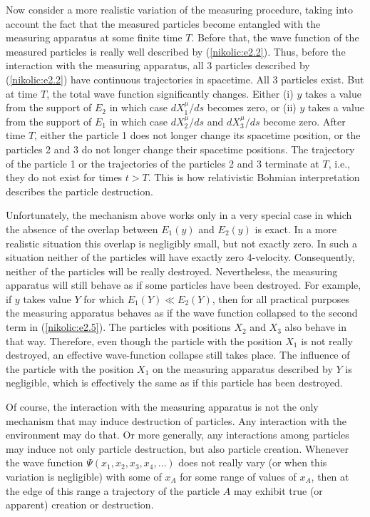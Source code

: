 \documentclass[12pt,twoside]{report} %
\begin{document}
Now consider a more realistic variation of the measuring procedure, taking into account
the fact that the measured particles become entangled with the measuring apparatus 
at some finite time $T$.
Before that, the wave function of the measured particles is really well described by 
(\ref{nikolic:e2.2}). Thus, before the interaction with the measuring apparatus, all 3 
particles described by (\ref{nikolic:e2.2}) have continuous trajectories in spacetime.
All 3 particles exist. But at time $T$, the total wave function significantly changes.
Either (i) $y$ takes a value from the support of $E_2$ in which case
$dX_1^{\mu}/ds$ becomes zero, or (ii) $y$ takes a value from the support of $E_1$
in which case  $dX_2^{\mu}/ds$ and $dX_3^{\mu}/ds$ become zero.
After time $T$, either the particle 1 does not longer change its spacetime position,
or the particles 2 and 3 do not longer change their spacetime positions.
The trajectory of the particle 1 or the trajectories of the particles 2 and 3 terminate
at $T$, i.e., they do not exist for times $t>T$. This is how relativistic Bohmian interpretation
describes the particle destruction. 

Unfortunately, the mechanism above works only in a very special case
in which the absence of the overlap between $E_1(y)$ and $E_2(y)$ is exact.
In a more realistic situation this overlap is negligibly small, but not exactly zero.
In such a situation neither of the particles will have exactly zero 4-velocity.
Consequently, neither of the particles will be really destroyed.
Nevertheless, the measuring apparatus will still behave as if some particles 
have been destroyed. For example, if $y$ takes value $Y$ 
for which $E_1(Y)\ll E_2(Y)$, then for all practical purposes the measuring apparatus
behaves as if the wave function collapsed to the second term in (\ref{nikolic:e2.5}).
The particles with positions $X_2$ and $X_3$ also behave in that way. 
Therefore, even though the particle with the position $X_1$ is not really destroyed,
an effective wave-function collapse still takes place. The influence of the particle
with the position $X_1$ on the measuring apparatus described by $Y$
is negligible, which is effectively the same 
as if this particle has been destroyed.

Of course, the interaction with the measuring apparatus is not the only mechanism
that may induce destruction of particles. Any interaction with the environment
may do that.  Or more generally, any interactions among particles 
may induce not only particle destruction, but also particle creation. 
Whenever the wave function $\Psi(x_1,x_2,x_3,x_4, \ldots )$ does not really vary
(or when this variation is negligible)
with some of $x_A$ for some range of values of $x_A$,
then at the edge of this range a trajectory of the particle $A$ may exhibit
true (or apparent) creation or destruction. 
\end{document}
